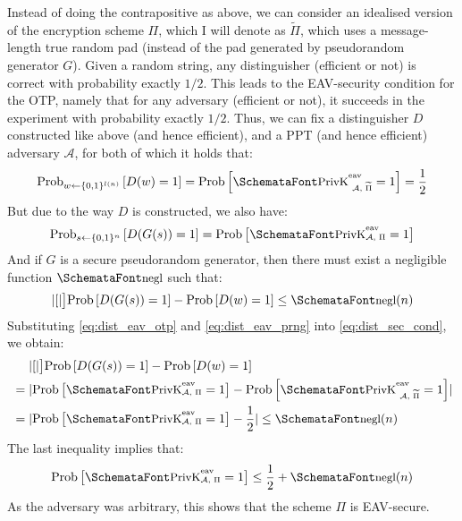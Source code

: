   \vspace{1em}

   Instead of doing the contrapositive as above, we can consider an idealised version of the encryption scheme $\Pi$, which I will denote as $\widetilde{\Pi}$, which uses a message-length true random pad (instead of the pad generated by pseudorandom generator $G$). Given a random string, any distinguisher (efficient or not) is correct with probability exactly $1/2$. This leads to the EAV-security condition for the OTP, namely that for any adversary (efficient or not), it succeeds in the \privkeav experiment with probability exactly $1/2$. Thus, we can fix a distinguisher $D$ constructed like above (and hence efficient), and a PPT (and hence efficient) adversary $\mathcal{A}$, for both of which it holds that:
  \begin{equation}
    \label{eq:dist_eav_otp}
    \textup{Prob}_{w \leftarrow \{0, 1\}^{l(n)}}\left[D(w) = 1\right] = \textup{Prob}\left[\privkeavprime = 1\right] = \frac{1}{2}
  \end{equation}
  But due to the way $D$ is constructed, we also have:
  \begin{equation}
    \label{eq:dist_eav_prng}
    \textup{Prob}_{s \leftarrow \{0, 1\}^{n}}\left[D(G(s)) = 1\right] = \textup{Prob}\left[\privkeav = 1\right]
  \end{equation}
  And if $G$ is a secure pseudorandom generator, then there must exist a negligible function $\myemph{negl}$ such that:
  \begin{equation}
    \label{eq:dist_sec_cond}
    \abs*[\big]{\textup{Prob}\left[D(G(s)) = 1\right] - \textup{Prob}\left[D(w) = 1\right]} \le \myemph{negl}(n)
  \end{equation}
  Substituting \eqref{eq:dist_eav_otp} and \eqref{eq:dist_eav_prng} into \eqref{eq:dist_sec_cond}, we obtain:
  \begin{align}
    &\phantom{{}={}}\abs*[\big]{\textup{Prob}\left[D(G(s)) = 1\right] - \textup{Prob}\left[D(w) = 1\right]} \\
    &=\abs{\textup{Prob}\left[\privkeav = 1\right] - \textup{Prob}\left[\privkeavprime = 1\right]} \\
    &=\abs{\textup{Prob}\left[\privkeav = 1\right] - \frac{1}{2}} \le \myemph{negl}(n)
  \end{align}
  The last inequality implies that:
  \begin{equation}
    \textup{Prob}\left[\privkeav = 1\right] \le \frac{1}{2} + \myemph{negl}(n)
  \end{equation}
  As the adversary was arbitrary, this shows that the scheme $\Pi$ is EAV-secure.

